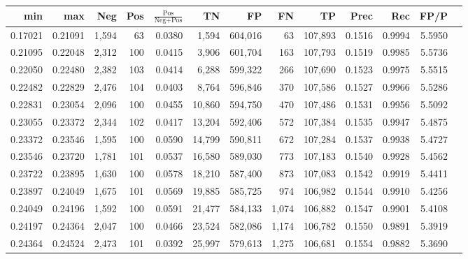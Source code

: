 \begin{tabular}{rrrrrrrrrrrrr}
\toprule
    min &     max &   Neg & Pos & $\frac{\text{Pos}}{\text{Neg}+\text{Pos}}$ &      TN &      FP &      FN &      TP &   Prec &    Rec &   FP/P \\
\midrule
0.17021 & 0.21091 & 1,594 &  63 &                                     0.0380 &   1,594 & 604,016 &      63 & 107,893 & 0.1516 & 0.9994 & 5.5950 \\
0.21095 & 0.22048 & 2,312 & 100 &                                     0.0415 &   3,906 & 601,704 &     163 & 107,793 & 0.1519 & 0.9985 & 5.5736 \\
0.22050 & 0.22480 & 2,382 & 103 &                                     0.0414 &   6,288 & 599,322 &     266 & 107,690 & 0.1523 & 0.9975 & 5.5515 \\
0.22482 & 0.22829 & 2,476 & 104 &                                     0.0403 &   8,764 & 596,846 &     370 & 107,586 & 0.1527 & 0.9966 & 5.5286 \\
0.22831 & 0.23054 & 2,096 & 100 &                                     0.0455 &  10,860 & 594,750 &     470 & 107,486 & 0.1531 & 0.9956 & 5.5092 \\
0.23055 & 0.23372 & 2,344 & 102 &                                     0.0417 &  13,204 & 592,406 &     572 & 107,384 & 0.1535 & 0.9947 & 5.4875 \\
0.23372 & 0.23546 & 1,595 & 100 &                                     0.0590 &  14,799 & 590,811 &     672 & 107,284 & 0.1537 & 0.9938 & 5.4727 \\
0.23546 & 0.23720 & 1,781 & 101 &                                     0.0537 &  16,580 & 589,030 &     773 & 107,183 & 0.1540 & 0.9928 & 5.4562 \\
0.23722 & 0.23895 & 1,630 & 100 &                                     0.0578 &  18,210 & 587,400 &     873 & 107,083 & 0.1542 & 0.9919 & 5.4411 \\
0.23897 & 0.24049 & 1,675 & 101 &                                     0.0569 &  19,885 & 585,725 &     974 & 106,982 & 0.1544 & 0.9910 & 5.4256 \\
0.24049 & 0.24196 & 1,592 & 100 &                                     0.0591 &  21,477 & 584,133 &   1,074 & 106,882 & 0.1547 & 0.9901 & 5.4108 \\
0.24197 & 0.24364 & 2,047 & 100 &                                     0.0466 &  23,524 & 582,086 &   1,174 & 106,782 & 0.1550 & 0.9891 & 5.3919 \\
0.24364 & 0.24524 & 2,473 & 101 &                                     0.0392 &  25,997 & 579,613 &   1,275 & 106,681 & 0.1554 & 0.9882 & 5.3690 \\

\end{tabular}
